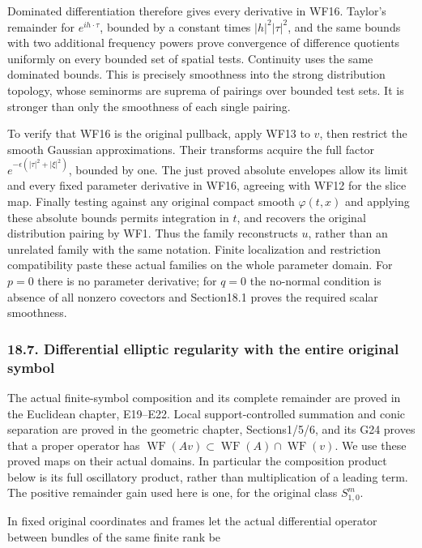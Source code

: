 \documentclass[
  11pt,
]{article}
\begin{document}
Dominated differentiation therefore gives every derivative in WF16.
Taylor's remainder for \(e^{ih\cdot\tau}\), bounded by a constant times
\(|h|^2|\tau|^2\), and the same bounds with two additional frequency
powers prove convergence of difference quotients uniformly on every
bounded set of spatial tests. Continuity uses the same dominated bounds.
This is precisely smoothness into the strong distribution topology,
whose seminorms are suprema of pairings over bounded test sets. It is
stronger than only the smoothness of each single pairing.

To verify that WF16 is the original pullback, apply WF13 to \(v\), then
restrict the smooth Gaussian approximations. Their transforms acquire
the full factor \(e^{-\epsilon(|\tau|^2+|\xi|^2)}\), bounded by one. The
just proved absolute envelopes allow its limit and every fixed parameter
derivative in WF16, agreeing with WF12 for the slice map. Finally
testing against any original compact smooth \(\varphi(t,x)\) and
applying these absolute bounds permits integration in \(t\), and
recovers the original distribution pairing by WF1. Thus the family
reconstructs \(u\), rather than an unrelated family with the same
notation. Finite localization and restriction compatibility paste these
actual families on the whole parameter domain. For \(p=0\) there is no
parameter derivative; for \(q=0\) the no-normal condition is absence of
all nonzero covectors and Section18.1 proves the required scalar
smoothness.

\subsubsection{18.7. Differential elliptic regularity with the entire
original
symbol}\label{differential-elliptic-regularity-with-the-entire-original-symbol}

The actual finite-symbol composition and its complete remainder are
proved in the Euclidean chapter, E19--E22. Local support-controlled
summation and conic separation are proved in the geometric chapter,
Sections1/5/6, and its G24 proves that a proper operator has
\(\operatorname{WF}(Av)\subset\operatorname{WF}(A)\cap\operatorname{WF}(v)\).
We use these proved maps on their actual domains. In particular the
composition product below is its full oscillatory product, rather than
multiplication of a leading term. The positive remainder gain used here
is one, for the original class \(S^m_{1,0}\).

In fixed original coordinates and frames let the actual differential
operator between bundles of the same finite rank be
\end{document}
